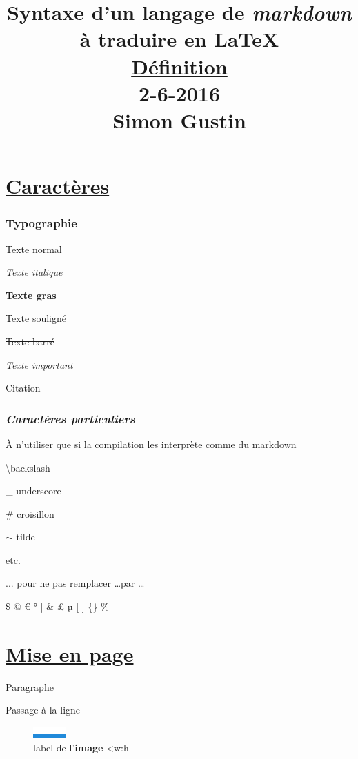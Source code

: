 \documentclass{article}
\title{Syntaxe d'un langage de \textit{markdown} à traduire en \textbf{LaTeX}\\\underline{Définition}\\2-6-2016\\Simon Gustin}
\author{}
\date{}
\begin{document}
\maketitle

	

	\part{\underline{Caractères}}

		\section{\textbf{Typographie}}

			Texte normal

			\textit{Texte italique}

			\textbf{Texte gras}

			\underline{Texte souligné}

			\sout{Texte barré}

			\emph{Texte important}

			\textrm{  		Citation }

			

		\section{\textit{Caractères particuliers}}%

			À n'utiliser que si la compilation les interprète comme du markdown

			\textbackslash  backslash

			\_ underscore

			\# croisillon

			$\sim$ tilde

			etc.

			

			... pour ne pas remplacer \dots  par …

			

			\$ @ € ° | \& £ µ [ ] \{\} \%%

			

	\part{\underline{Mise en page}}

		Paragraphe

		Passage à la ligne

		

		\begin{figure}[h!]
			\centering
			\includegraphics{image.png}
			\caption{label de l'\textbf{image} <w:h}
		\end{figure}
\end{document}
